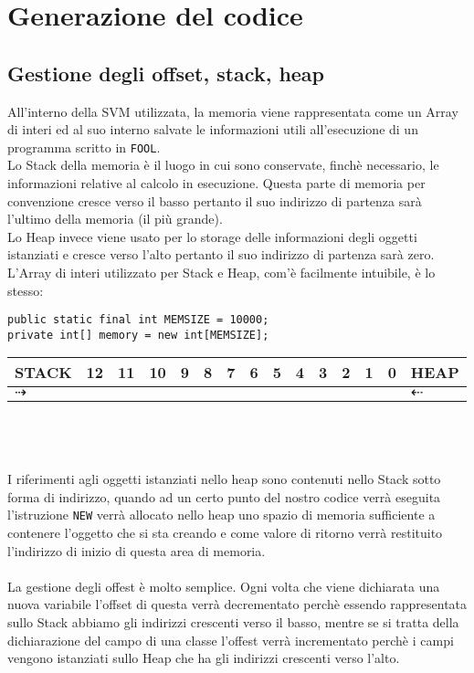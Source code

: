 \documentclass[a4paper]{article}   %
\begin{document}
\section{Generazione del codice}

\subsection{Gestione degli offset, stack, heap}
All'interno della SVM utilizzata, la memoria viene rappresentata come un Array di interi ed al suo interno salvate le informazioni utili all'esecuzione di un programma scritto in \lstinline|FOOL|.\\
Lo Stack della memoria è il luogo in cui sono conservate, finchè necessario, le informazioni relative al calcolo in esecuzione. Questa parte di memoria per convenzione cresce verso il basso
pertanto il suo indirizzo di partenza sarà l'ultimo della memoria (il più grande).\\
Lo Heap invece viene usato per lo storage delle informazioni degli oggetti istanziati e cresce verso l'alto pertanto il suo indirizzo di partenza sarà zero.\\
L'Array di interi utilizzato per Stack e Heap, com'è facilmente intuibile, è lo stesso:
\begin{lstlisting}[basicstyle=\footnotesize\ttfamily]
public static final int MEMSIZE = 10000;
private int[] memory = new int[MEMSIZE];
\end{lstlisting}
\begin{tabular}{ l | l | l | l | l | l | l | l | l | l | l | l | l | l | l     }
    \hline
    STACK & 12 & 11 & 10 & 9 & 8 & 7 & 6 & 5 & 4 & 3 & 2 & 1 & 0 & HEAP\\ \hline
    $\dashrightarrow$ &  &  &  &  &  &  &  &  &  &  &  &  & &  $\dashleftarrow$\\ \hline
  \end{tabular}
\\\\\\
I riferimenti agli oggetti istanziati nello heap sono contenuti nello Stack sotto forma di indirizzo, quando ad un certo punto del nostro codice verrà eseguita l'istruzione \lstinline|NEW| verrà allocato nello heap uno spazio di memoria sufficiente a contenere l'oggetto che si sta creando e come valore di ritorno verrà restituito l'indirizzo di inizio di questa area di memoria.
\\\\
La gestione degli offest è molto semplice. Ogni volta che viene dichiarata una nuova variabile l'offset di questa verrà decrementato perchè essendo rappresentata sullo Stack abbiamo gli indirizzi crescenti verso il basso, mentre se si tratta della dichiarazione del campo di una classe l'offest verrà incrementato perchè i campi vengono istanziati sullo Heap che ha gli indirizzi crescenti verso l'alto.
\end{document}
